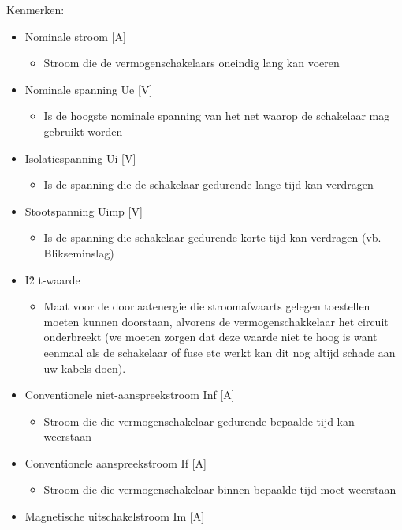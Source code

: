 \documentclass[12pt]{article}
\begin{document}
Kenmerken:\begin{itemize}
    \item Nominale stroom [A]\begin{itemize}
        \item Stroom die de vermogenschakelaars oneindig lang kan voeren
    \end{itemize}
    \item Nominale spanning Ue [V]\begin{itemize}
        \item Is de hoogste nominale spanning van het net waarop de schakelaar mag gebruikt worden
    \end{itemize}
    \item Isolatiespanning Ui [V]\begin{itemize}
        \item Is de spanning die de schakelaar gedurende lange tijd kan verdragen 
    \end{itemize}
    \item Stootspanning Uimp [V]\begin{itemize}
        \item Is de spanning die schakelaar gedurende korte tijd kan verdragen (vb. Blikseminslag)
    \end{itemize}
    \item I\^2 t-waarde\begin{itemize}
        \item Maat voor de doorlaatenergie die stroomafwaarts gelegen toestellen moeten kunnen doorstaan, alvorens de vermogenschakkelaar het circuit onderbreekt (we moeten zorgen dat deze waarde niet te hoog is want eenmaal als de schakelaar of fuse etc werkt kan dit nog altijd schade aan uw kabels doen).
    \end{itemize}
    \item Conventionele niet-aanspreekstroom Inf [A]\begin{itemize}
        \item Stroom die die vermogenschakelaar gedurende bepaalde tijd kan weerstaan
    \end{itemize}
    \item Conventionele aanspreekstroom If [A]\begin{itemize}
        \item Stroom die die vermogenschakelaar binnen bepaalde tijd moet weerstaan
    \end{itemize}
    \item Magnetische uitschakelstroom Im [A]\begin{itemize}

\end{itemize}
\end{itemize}
\end{document}
